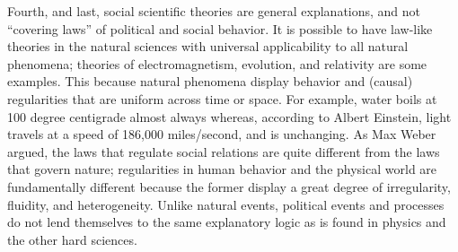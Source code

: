 \documentclass{book}
\begin{document}
Fourth, and last, social scientific theories are general explanations, and not
``covering laws'' of political and social behavior. It is possible to have
law-like theories in the natural sciences with universal applicability to all
natural phenomena; theories of electromagnetism, evolution, and relativity are
some examples. This because natural phenomena display behavior and (causal)
regularities that are uniform across time or space. For example, water boils
at 100 degree centigrade almost always whereas, according to Albert Einstein,
light travels at a speed of 186,000 miles/second, and is unchanging. As Max
Weber argued, the laws that regulate social relations are quite different from
the laws that govern nature; regularities in human behavior and the physical
world are fundamentally different because the former display a great degree of
irregularity, fluidity, and heterogeneity. Unlike natural events, political
events and processes do not lend themselves to the same explanatory logic as
is found in physics and the other hard sciences.
\end{document}
